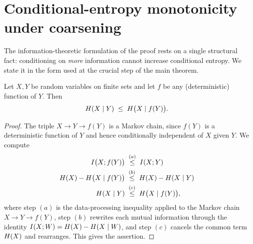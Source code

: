 \section{Conditional-entropy monotonicity under coarsening}
\label{sec:cond-mono}

The information-theoretic formulation of the proof rests on a single structural
fact: conditioning on \emph{more} information cannot increase conditional
entropy. We state it in the form used at the crucial step of the main theorem.

\begin{lemma}
\label{lem:cond-mono}
Let $X, Y$ be random variables on finite sets and let $f$ be any (deterministic)
function of $Y$. Then
\begin{align*}
H(X \mid Y) \;\le\; H\bigl(X \mid f(Y)\bigr).
\end{align*}
\end{lemma}

\begin{proof}
The triple $X \to Y \to f(Y)$ is a Markov chain, since $f(Y)$ is a deterministic
function of $Y$ and hence conditionally independent of $X$ given $Y$. We compute
\begin{align*}
I\bigl(X; f(Y)\bigr)
&\;\overset{(a)}{\le}\; I(X; Y) \\
H(X) - H\bigl(X \mid f(Y)\bigr)
&\;\overset{(b)}{\le}\; H(X) - H(X \mid Y) \\
H(X \mid Y)
&\;\overset{(c)}{\le}\; H\bigl(X \mid f(Y)\bigr),
\end{align*}
where step $(a)$ is the data-processing inequality 
applied to the Markov chain $X \to Y \to f(Y)$, step $(b)$ rewrites each mutual
information through the identity $I(X; W) = H(X) - H(X \mid W)$, and
step $(c)$ cancels the common term $H(X)$ and rearranges. This gives the
assertion.
\end{proof}
